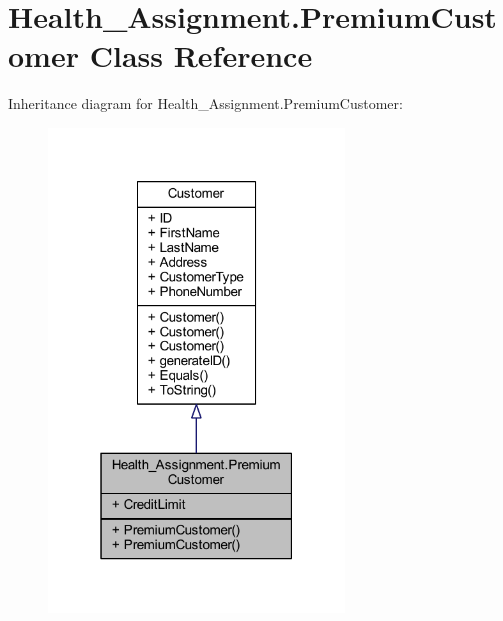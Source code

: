 \hypertarget{class_health___assignment_1_1_premium_customer}{}\section{Health\+\_\+\+Assignment.\+Premium\+Customer Class Reference}
\label{class_health___assignment_1_1_premium_customer}


Inheritance diagram for Health\+\_\+\+Assignment.\+Premium\+Customer\+:\nopagebreak
\begin{figure}[H]
\begin{center}
\leavevmode
\includegraphics[width=223pt]{class_health___assignment_1_1_premium_customer__inherit__graph}
\end{center}
\end{figure}


